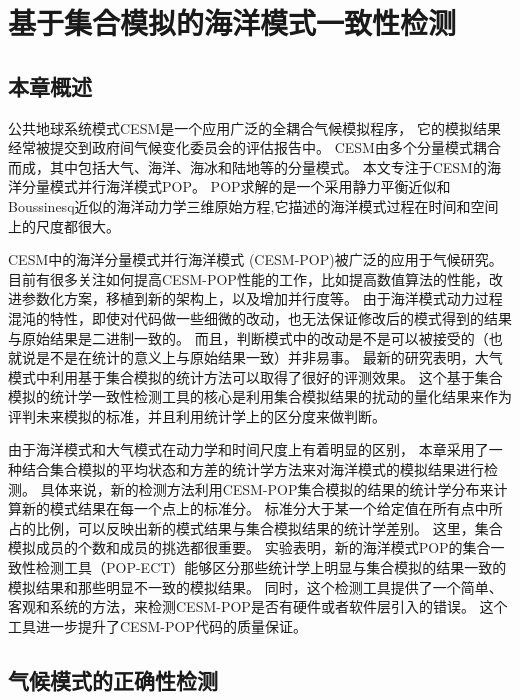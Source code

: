 \chapter{基于集合模拟的海洋模式一致性检测}
\label{cha:verify}

\section{本章概述}
\label{verify:intro}

公共地球系统模式CESM是一个应用广泛的全耦合气候模拟程序\cite{hurrell2013community}， 它的模拟结果经常被提交到政府间气候变化委员会的评估报告中\cite{stocker2013ipcc}。
CESM由多个分量模式耦合而成，其中包括大气、海洋、海冰和陆地等的分量模式。 
本文专注于CESM的海洋分量模式并行海洋模式POP。  
POP求解的是一个采用静力平衡近似和Boussinesq近似的海洋动力学三维原始方程,它描述的海洋模式过程在时间和空间上的尺度都很大。  

CESM中的海洋分量模式并行海洋模式 (CESM-POP)被广泛的应用于气候研究。 
目前有很多关注如何提高CESM-POP性能的工作，比如提高数值算法的性能，改进参数化方案，移植到新的架构上，以及增加并行度等。 
由于海洋模式动力过程混沌的特性，即使对代码做一些细微的改动，也无法保证修改后的模式得到的结果与原始结果是二进制一致的。 
而且，判断模式中的改动是不是可以被接受的（也就说是不是在统计的意义上与原始结果一致）并非易事。 
最新的研究表明，大气模式中利用基于集合模拟的统计方法可以取得了很好的评测效果。
这个基于集合模拟的统计学一致性检测工具的核心是利用集合模拟结果的扰动的量化结果来作为评判未来模拟的标准，并且利用统计学上的区分度来做判断。 

由于海洋模式和大气模式在动力学和时间尺度上有着明显的区别，
本章采用了一种结合集合模拟的平均状态和方差的统计学方法来对海洋模式的模拟结果进行检测。 
具体来说，新的检测方法利用CESM-POP集合模拟的结果的统计学分布来计算新的模式结果在每一个点上的标准分。 
标准分大于某一个给定值在所有点中所占的比例，可以反映出新的模式结果与集合模拟结果的统计学差别。 
这里，集合模拟成员的个数和成员的挑选都很重要。
实验表明，新的海洋模式POP的集合一致性检测工具（POP-ECT）能够区分那些统计学上明显与集合模拟的结果一致的模拟结果和那些明显不一致的模拟结果。 
同时，这个检测工具提供了一个简单、客观和系统的方法，来检测CESM-POP是否有硬件或者软件层引入的错误。
这个工具进一步提升了CESM-POP代码的质量保证。 

\section{气候模式的正确性检测}
\label{verify:Backgroud}

